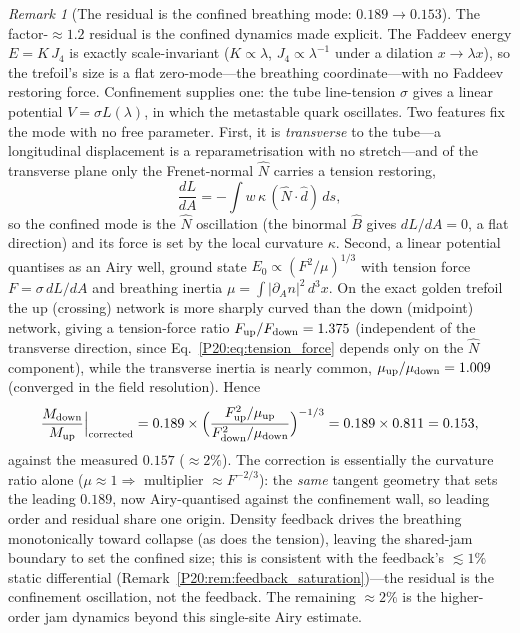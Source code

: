 \documentclass[11pt,a4paper]{article}
\theoremstyle{definition}\newtheorem{definition}[theorem]{Definition}
\theoremstyle{remark}
\newtheorem{remark}[theorem]{Remark}
\newcommand{\Mup}{M_{\mathrm{up}}}
\newcommand{\Mdn}{M_{\mathrm{down}}}
\begin{document}
\begin{remark}[The residual is the confined breathing mode: $0.189\to0.153$]
\label{P20:rem:isospin_breathing}
The factor-$\approx1.2$ residual is the confined dynamics made explicit. The
Faddeev energy $E=K\,J_4$ is exactly scale-invariant ($K\propto\lambda$,
$J_4\propto\lambda^{-1}$ under a dilation $x\to\lambda x$), so the trefoil's
size is a flat zero-mode---the breathing coordinate---with no Faddeev
restoring force. Confinement supplies one: the tube line-tension $\sigma$
gives a linear potential $V=\sigma L(\lambda)$, in which the metastable quark
oscillates. Two features fix the mode with no free parameter. First, it is
\emph{transverse} to the tube---a longitudinal displacement is a
reparametrisation with no stretch---and of the transverse plane only the
Frenet-normal $\hat N$ carries a tension restoring,
\begin{equation}
  \frac{dL}{dA}=-\!\int w\,\kappa\,(\hat N\!\cdot\!\hat d)\,ds ,
  \label{P20:eq:tension_force}
\end{equation}
so the confined mode is the $\hat N$ oscillation (the binormal $\hat B$ gives
$dL/dA=0$, a flat direction) and its force is set by the local curvature
$\kappa$. Second, a linear potential quantises as an Airy well, ground state
$E_0\propto(F^2/\mu)^{1/3}$ with tension force $F=\sigma\,dL/dA$ and breathing
inertia $\mu=\int|\partial_A n|^2\,d^3x$. On the exact golden trefoil the up
(crossing) network is more sharply curved than the down (midpoint) network,
giving a tension-force ratio $F_{\rm up}/F_{\rm down}=1.375$ (independent of
the transverse direction, since Eq.~\eqref{P20:eq:tension_force} depends only
on the $\hat N$ component), while the transverse inertia is nearly common,
$\mu_{\rm up}/\mu_{\rm down}=1.009$ (converged in the field resolution). Hence
\begin{equation}
  \frac{\Mdn}{\Mup}\Big|_{\rm corrected}
   =0.189\times\Bigl(\frac{F_{\rm up}^2/\mu_{\rm up}}
                          {F_{\rm down}^2/\mu_{\rm down}}\Bigr)^{-1/3}
   =0.189\times0.811=0.153 ,
\end{equation}
against the measured $0.157$ ($\approx2\%$). The correction is essentially the
curvature ratio alone ($\mu\!\approx\!1\Rightarrow$ multiplier
$\approx F^{-2/3}$): the \emph{same} tangent geometry that sets the leading
$0.189$, now Airy-quantised against the confinement wall, so leading order and
residual share one origin. Density feedback drives the breathing monotonically
toward collapse (as does the tension), leaving the shared-jam boundary to set
the confined size; this is consistent with the feedback's $\lesssim1\%$ static
differential (Remark~\ref{P20:rem:feedback_saturation})---the residual is the
confinement oscillation, not the feedback. The remaining $\approx2\%$ is the
higher-order jam dynamics beyond this single-site Airy estimate.
\end{remark}
\end{document}
